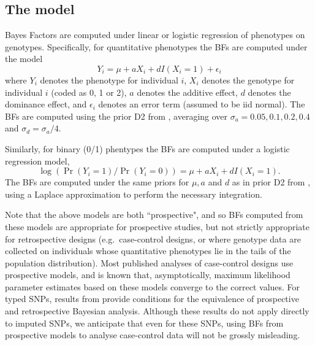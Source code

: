 \documentclass[11pt,Palatino]{article}
\def\bimbam{{\sc bimbam}~}
\begin{document}

\subsection{The model}
Bayes Factors are computed under linear or logistic regression of phenotypes on genotypes. Specifically, for quantitative phenotypes
the BFs are computed under the model
\begin{equation}
Y_i = \mu + a X_i + d I(X_i =1) + \epsilon_i
\end{equation}
where $Y_i$ denotes the phenotype for individual $i$, $X_i$ denotes the genotype for individual $i$
(coded as 0, 1 or 2), $a$ denotes the additive effect, $d$ denotes the dominance effect, and $\epsilon_i$ denotes
an error term (assumed to be iid normal). The BFs are computed using the prior D2 from \cite{servin.stephens.07}, averaging
over $\sigma_a = 0.05,0.1,0.2,0.4$ and $\sigma_d = \sigma_a/4$.

Similarly, for binary (0/1) phentypes the BFs are computed under
a logistic regression model,
\begin{equation}
\log(\Pr(Y_i=1)/\Pr(Y_i=0)) = \mu + a X_i + d I(X_i = 1).
\end{equation}
The BFs are computed under the same priors for $\mu, a$ and $d$ as in prior D2 from \cite{servin.stephens.07},
using a Laplace approximation to perform the necessary integration.

Note that the above models are both ``prospective",
and so BFs computed from these models are appropriate for prospective studies, but not strictly
appropriate for retrospective designs (e.g.~case-control designs, or where genotype data are collected
on individuals whose quantitative phenotypes lie in the tails of the population distribution).
Most published analyses of case-control designs use prospective models, and is known that,
asymptotically, maximum likelihood parameter estimates based on these models converge to
the correct values.
For typed SNPs, results from  provide conditions for the equivalence of prospective and retrospective Bayesian analysis. Although these results do not apply directly to imputed SNPs, we anticipate that even for these SNPs, using BFs from prospective models to analyse case-control data will not be grossly misleading.
\end{document}
